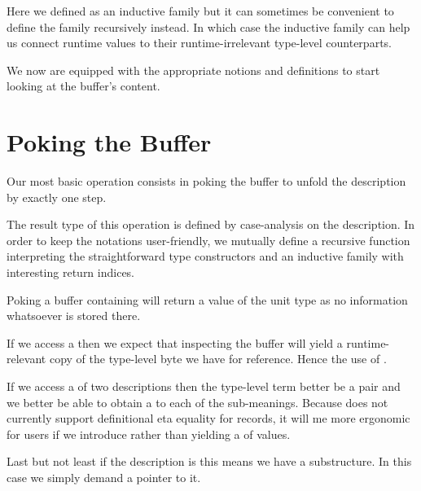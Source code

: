 

Here we defined  as an inductive family but it can
sometimes be convenient to define the family recursively instead.
In which case the  inductive family can
help us connect runtime values to their
runtime-irrelevant type-level counterparts.



We now are equipped with the appropriate notions and definitions to
start looking at the buffer's content.

\section{Poking the Buffer}

Our most basic operation consists in poking the buffer to unfold
the description by exactly one step.


The result type of this operation is defined by case-analysis on the
description. In order to keep the notations user-friendly, we
mutually define
a recursive function  interpreting the straightforward type constructors
and an inductive family  with interesting return indices.


Poking a buffer containing  will return a value of
the unit type as no information whatsoever is stored there.

If we access a  then we expect that inspecting the
buffer will yield a runtime-relevant copy of the type-level byte we
have for reference. Hence the use of .

If we access a  of two descriptions then the type-level term
better be a pair and we better be able to obtain a 
to each of the sub-meanings.
%
Because \idris{} does not currently support definitional eta equality
for records, it will me more ergonomic for users if we introduce
 rather than yielding a  of values.

Last but not least if the description is  this means
we have a substructure. In this case we simply demand a pointer to it.


